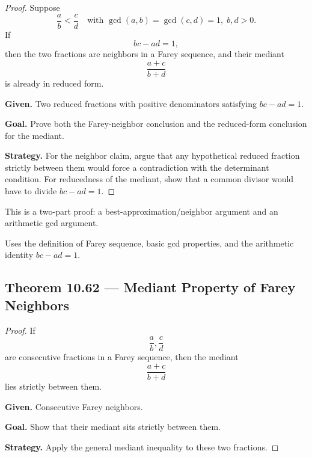 \begin{proof}
\Claim Suppose
\[
\frac{a}{b} < \frac{c}{d}
\quad\text{with } \gcd(a,b)=\gcd(c,d)=1,\; b,d>0.
\]
If
\[
bc-ad = 1,
\]
then the two fractions are neighbors in a Farey sequence, and their mediant
\[
\frac{a+c}{b+d}
\]
is already in reduced form.

\textbf{Given.} Two reduced fractions with positive denominators satisfying $bc-ad=1$.

\textbf{Goal.} Prove both the Farey-neighbor conclusion and the reduced-form conclusion for the mediant.

\textbf{Strategy.} For the neighbor claim, argue that any hypothetical reduced fraction strictly between them would force a contradiction with the determinant condition.  For reducedness of the mediant, show that a common divisor would have to divide $bc-ad=1$.


\end{proof}

\begin{remark*}
This is a two-part proof: a best-approximation/neighbor argument and an
arithmetic gcd argument.
\end{remark*}

\begin{remark*}[Dependencies]
Uses the definition of Farey sequence, basic gcd properties, and the arithmetic
identity $bc-ad=1$.
\end{remark*}


\subsection*{Theorem 10.62 — Mediant Property of Farey Neighbors}
\label{prf:grep-mediant-farey-neighbors}

\begin{proof}
\Claim If
\[
\frac{a}{b},\frac{c}{d}
\]
are consecutive fractions in a Farey sequence, then the mediant
\[
\frac{a+c}{b+d}
\]
lies strictly between them.

\textbf{Given.} Consecutive Farey neighbors.

\textbf{Goal.} Show that their mediant sits strictly between them.

\textbf{Strategy.} Apply the general mediant inequality to these two fractions.


\end{proof}

